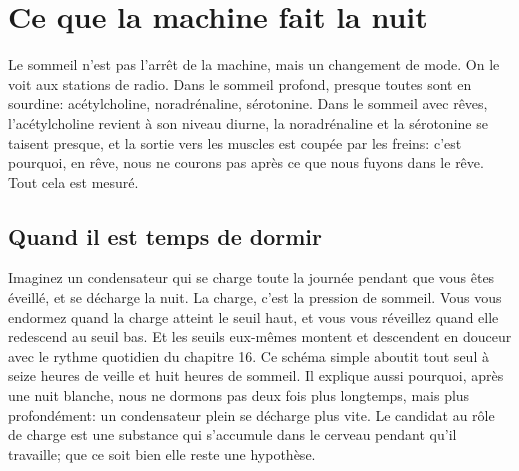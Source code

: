 \chapter{Ce que la machine fait la nuit}

Le sommeil n'est pas l'arrêt de la machine, mais un changement de mode. On le voit aux stations de radio. Dans le sommeil profond, presque toutes sont en sourdine: acétylcholine, noradrénaline, sérotonine. Dans le sommeil avec rêves, l'acétylcholine revient à son niveau diurne, la noradrénaline et la sérotonine se taisent presque, et la sortie vers les muscles est coupée par les freins: c'est pourquoi, en rêve, nous ne courons pas après ce que nous fuyons dans le rêve. Tout cela est mesuré.

\section*{Quand il est temps de dormir}

Imaginez un condensateur qui se charge toute la journée pendant que vous êtes éveillé, et se décharge la nuit. La charge, c'est la \og pression de sommeil\fg{}. Vous vous endormez quand la charge atteint le seuil haut, et vous vous réveillez quand elle redescend au seuil bas. Et les seuils eux-mêmes montent et descendent en douceur avec le rythme quotidien du chapitre 16. Ce schéma simple aboutit tout seul à seize heures de veille et huit heures de sommeil. Il explique aussi pourquoi, après une nuit blanche, nous ne dormons pas deux fois plus longtemps, mais plus profondément: un condensateur plein se décharge plus vite. Le candidat au rôle de \og charge\fg{} est une substance qui s'accumule dans le cerveau pendant qu'il travaille; que ce soit bien elle reste une hypothèse.


